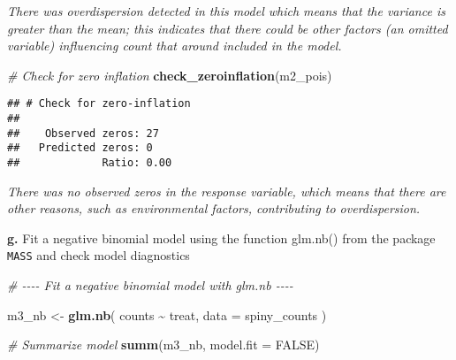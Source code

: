 \documentclass[
]{article}
\newenvironment{Shaded}{\begin{snugshade}}{\end{snugshade}}
\newcommand{\AttributeTok}[1]{\textcolor[rgb]{0.13,0.29,0.53}{#1}}
\newcommand{\CommentTok}[1]{\textcolor[rgb]{0.56,0.35,0.01}{\textit{#1}}}
\newcommand{\ConstantTok}[1]{\textcolor[rgb]{0.56,0.35,0.01}{#1}}
\newcommand{\FunctionTok}[1]{\textcolor[rgb]{0.13,0.29,0.53}{\textbf{#1}}}
\newcommand{\NormalTok}[1]{#1}
\newcommand{\OtherTok}[1]{\textcolor[rgb]{0.56,0.35,0.01}{#1}}
\newcommand{\SpecialCharTok}[1]{\textcolor[rgb]{0.81,0.36,0.00}{\textbf{#1}}}
\begin{document}
\emph{There was overdispersion detected in this model which means that
the variance is greater than the mean; this indicates that there could
be other factors (an omitted variable) influencing count that around
included in the model.}

\begin{Shaded}
\begin{Highlighting}[]
\CommentTok{\# Check for zero inflation}
\FunctionTok{check\_zeroinflation}\NormalTok{(m2\_pois)}
\end{Highlighting}
\end{Shaded}

\begin{verbatim}
## # Check for zero-inflation
## 
##    Observed zeros: 27
##   Predicted zeros: 0
##             Ratio: 0.00
\end{verbatim}

\emph{There was no observed zeros in the response variable, which means
that there are other reasons, such as environmental factors,
contributing to overdispersion.}

\textbf{g.} Fit a negative binomial model using the function glm.nb()
from the package \texttt{MASS} and check model diagnostics

\begin{Shaded}
\begin{Highlighting}[]
\CommentTok{\# {-}{-}{-}{-} Fit a negative binomial model with glm.nb {-}{-}{-}{-}}

\NormalTok{m3\_nb }\OtherTok{\textless{}{-}} \FunctionTok{glm.nb}\NormalTok{(}
\NormalTok{    counts }\SpecialCharTok{\textasciitilde{}}\NormalTok{ treat,}
    \AttributeTok{data =}\NormalTok{ spiny\_counts}
\NormalTok{)}

\CommentTok{\# Summarize model}
\FunctionTok{summ}\NormalTok{(m3\_nb, }\AttributeTok{model.fit =} \ConstantTok{FALSE}\NormalTok{)}
\end{Highlighting}
\end{Shaded}
\end{document}
